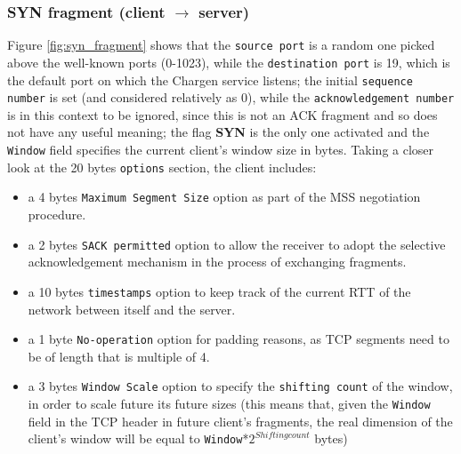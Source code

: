 \documentclass{exam}
\begin{document}
\subsubsection{SYN fragment (client $\rightarrow$ server)}
Figure \ref{fig:syn_fragment} shows that the \verb|source port| is a random one picked above the well-known ports (0-1023), while the \verb|destination port| is 19, which is the default port on which the Chargen service listens; the initial \verb|sequence number| is set (and considered relatively as 0), while the \verb|acknowledgement number| is in this context to be ignored, since this is not an ACK fragment and so does not have any useful meaning; the flag \textbf{SYN} is the only one activated and the \verb|Window| field specifies the current client's window size in bytes. Taking a closer look at the 20 bytes \verb|options| section, the client includes:
\begin{itemize}
    \item a 4 bytes \verb|Maximum Segment Size| option as part of the MSS negotiation procedure.
    \item a 2 bytes \verb|SACK permitted| option to allow the receiver to adopt the selective acknowledgement mechanism in the process of exchanging fragments.
    \item a 10 bytes \verb|timestamps| option to keep track of the current RTT of the network between itself and the server.
    \item a 1 byte \verb|No-operation| option for padding reasons, as TCP segments need to be of length that is multiple of 4.
    \item a 3 bytes \verb|Window Scale| option to specify the \verb|shifting count| of the window, in order to scale future its future sizes (this means that, given the \verb|Window| field in the TCP header in future client's fragments, the real dimension of the client's window will be equal to \verb|Window|*$2^{Shifting count}$ bytes)
\end{itemize}    
\end{document}
